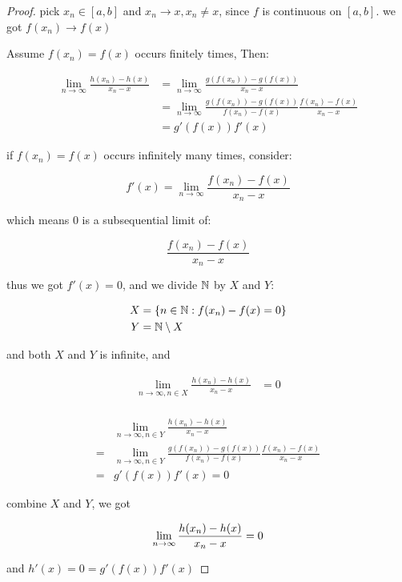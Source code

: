 \begin{proof}
   pick $x_n \in [a,b]$  and $x_n \to x, x_n \ne x$, since $f$ is continuous on $[a,b]$. we got $f(x_n) \to f(x)$


   Assume $f(x_n) = f(x)$ occurs finitely times, Then:

   \begin{align*}
        \lim_{n \to \infty}\frac{h(x_n) - h(x)}{x_n -x} &= \lim_{n \to \infty}\frac{g(f(x_n)) - g(f(x))}{x_n -x} \\
        &=  \lim_{n \to \infty}\frac{g(f(x_n)) - g(f(x))}{f(x_n) -f(x)}\frac{f(x_n) - f(x)}{x_n -x} \\
        &= g'(f(x)) f'(x)
   \end{align*}

   if $f(x_n) = f(x)$ occurs infinitely many times, consider:

   \[
    f'(x) = \lim_{n \to \infty}\frac{f(x_n) - f(x)}{x_n -x}
   \]

   which means $0$ is a subsequential limit of:
   
   \[
        \frac{f(x_n) - f(x)}{x_n -x}
   \]

   thus we got $f'(x) = 0$, and we divide $\mathbb{N}$ by $X$ and $Y$:

   \begin{align*}
        X &= \{ n \in \mathbb{N}: f(x_n) - f(x) = 0\} \\
        Y &= \mathbb{N} \setminus X
   \end{align*}

   and both $X$ and $Y$ is infinite, and

   \begin{align*}
        \lim_{n \to \infty, n \in X}\frac{h(x_n) - h(x)}{x_n -x} &= 0 \\
   \end{align*}

   \begin{align*}
        & \lim_{n \to \infty, n \in Y}\frac{h(x_n) - h(x)}{x_n -x} \\
        = &\lim_{n \to \infty, n \in Y}\frac{g(f(x_n)) - g(f(x))}{f(x_n) -f(x)}\frac{f(x_n) - f(x)}{x_n -x} \\ 
        = & g'(f(x))f'(x) = 0
   \end{align*}

   combine $X$ and $Y$, we got

   \[
        \lim_{n \to \infty}\frac{h(x_n) - h(x)}{x_n -x} = 0 \\
   \]

   and $h'(x) = 0 = g'(f(x))f'(x)$

\end{proof}



